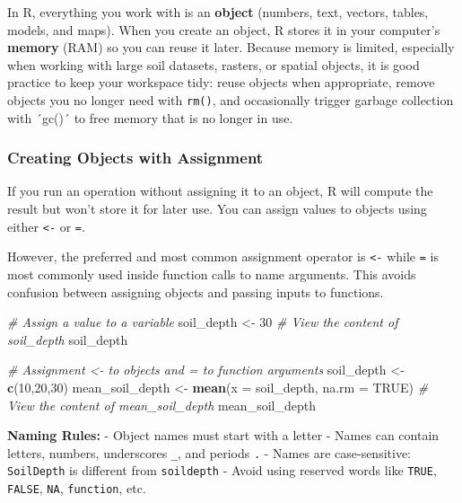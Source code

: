 \documentclass[
  10pt,
  b5paper,
  oneside]{book}
\newenvironment{Shaded}{\begin{snugshade}}{\end{snugshade}}
\newcommand{\AttributeTok}[1]{\textcolor[rgb]{0.13,0.29,0.53}{#1}}
\newcommand{\CommentTok}[1]{\textcolor[rgb]{0.56,0.35,0.01}{\textit{#1}}}
\newcommand{\ConstantTok}[1]{\textcolor[rgb]{0.56,0.35,0.01}{#1}}
\newcommand{\DecValTok}[1]{\textcolor[rgb]{0.00,0.00,0.81}{#1}}
\newcommand{\FunctionTok}[1]{\textcolor[rgb]{0.13,0.29,0.53}{\textbf{#1}}}
\newcommand{\NormalTok}[1]{#1}
\newcommand{\OtherTok}[1]{\textcolor[rgb]{0.56,0.35,0.01}{#1}}
\begin{document}
In R, everything you work with is an \textbf{object} (numbers, text, vectors, tables, models, and maps). When you create an object, R stores it in your computer's \textbf{memory} (RAM) so you can reuse it later. Because memory is limited, especially when working with large soil datasets, rasters, or spatial objects, it is good practice to keep your workspace tidy: reuse objects when appropriate, remove objects you no longer need with \texttt{rm()}, and occasionally trigger garbage collection with ´gc()´ to free memory that is no longer in use.

\subsubsection{Creating Objects with Assignment}\label{object-assignment}

If you run an operation without assigning it to an object, R will compute the result but won't store it for later use.
You can assign values to objects using either \texttt{\textless{}-} or \texttt{=}.

However, the preferred and most common assignment operator is \texttt{\textless{}-} while \texttt{=} is most commonly used inside function calls to name arguments. This avoids confusion between assigning objects and passing inputs to functions.

\begin{Shaded}
\begin{Highlighting}[]
\CommentTok{\# Assign a value to a variable}
\NormalTok{soil\_depth }\OtherTok{\textless{}{-}} \DecValTok{30}
\CommentTok{\# View the content of soil\_depth}
\NormalTok{soil\_depth}

\CommentTok{\# Assignment \textasciigrave{}\textless{}{-}\textasciigrave{} to objects and \textasciigrave{}=\textasciigrave{} to function arguments}
\NormalTok{soil\_depth }\OtherTok{\textless{}{-}} \FunctionTok{c}\NormalTok{(}\DecValTok{10}\NormalTok{,}\DecValTok{20}\NormalTok{,}\DecValTok{30}\NormalTok{)}
\NormalTok{mean\_soil\_depth }\OtherTok{\textless{}{-}} \FunctionTok{mean}\NormalTok{(}\AttributeTok{x =}\NormalTok{ soil\_depth, }\AttributeTok{na.rm =} \ConstantTok{TRUE}\NormalTok{)}
\CommentTok{\# View the content of mean\_soil\_depth}
\NormalTok{mean\_soil\_depth}
\end{Highlighting}
\end{Shaded}

\textbf{Naming Rules:}
- Object names must start with a letter
- Names can contain letters, numbers, underscores \texttt{\_}, and periods \texttt{.}
- Names are case-sensitive: \texttt{SoilDepth} is different from \texttt{soildepth}
- Avoid using reserved words like \texttt{TRUE}, \texttt{FALSE}, \texttt{NA}, \texttt{function}, etc.
\end{document}
